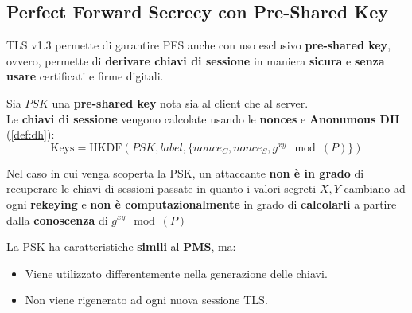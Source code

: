 \subsection{Perfect Forward Secrecy con Pre-Shared Key}
TLS v1.3 permette di garantire PFS anche con uso esclusivo \textbf{pre-shared key}, ovvero, permette di \textbf{derivare chiavi di sessione} in maniera \textbf{sicura} e \textbf{senza usare} certificati e firme digitali.
\begin{theorem}
Sia $PSK$ una \textbf{pre-shared key} nota sia al client che al server. \footnotemark \\
Le \textbf{chiavi di sessione} vengono calcolate usando le \textbf{nonces} e \textbf{Anonumous DH} (\cref{def:dh}):
\[\text{Keys}=\text{HKDF}(PSK,label,\{nonce_C,nonce_S,g^{xy}\mod(P)\})\]
\end{theorem}
\begin{remark}
Nel caso in cui venga scoperta la PSK, un attaccante \textbf{non è in grado} di recuperare le chiavi di sessioni passate in quanto i valori segreti $X,Y$ cambiano ad ogni \textbf{rekeying} e \textbf{non è computazionalmente} in grado di \textbf{calcolarli} a partire dalla \textbf{conoscenza} di $g^{xy}\mod(P)$
\end{remark}
\begin{remark}
La PSK ha caratteristiche \textbf{simili} al \textbf{PMS}, ma:
\begin{itemize}
    \item Viene utilizzato differentemente nella generazione delle chiavi.
    \item Non viene rigenerato ad ogni nuova sessione TLS.
\end{itemize}
\end{remark}
